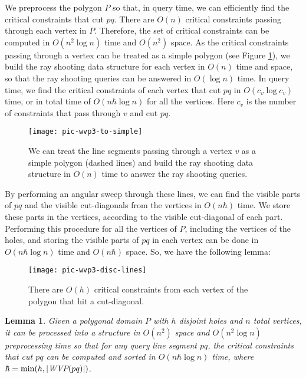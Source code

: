 \documentclass[5p]{elsarticle}
\newtheorem{lemma}[theorem]{Lemma}
\def\WVP{\mbox{\it{WVP}}}
\def\P{\mbox{${P}$}}
\begin{document}
We preprocess the polygon $\P$ so that, in query time, we can efficiently 
find the critical constraints that cut $pq$.
There are $O(n)$ critical constraints passing through each vertex in $\P$.
Therefore, the set of critical constraints can be computed in $O(n^2 \log n)$ time and 
$O(n^2)$ space. 
As the critical constraints passing through a vertex can be treated as a simple polygon 
(see Figure \ref{fig:wvp3-to-simple}),
we build the ray shooting data structure for each vertex in $O(n)$ time and space, so
that the ray shooting queries can be answered in $O(\log n)$ time.
In query time, we find the critical constraints of each vertex that cut $pq$ in $O(c_v \log c_v)$ time,
or in total time of $O(n\hbar \log n)$ for all the vertices. Here $c_v$ is the number of 
constraints that pass through $v$ and cut $pq$.

\begin{figure}[h]
  \centering
  \texttt{[image: pic-wvp3-to-simple]} 
  \caption{We can treat the line segments passing through a vertex $v$ as a simple
  polygon (dashed lines) and build the ray shooting data structure  in $O(n)$ time to answer the ray shooting 
  queries.}
  \label{fig:wvp3-to-simple}
\end{figure}



By performing an angular sweep through these lines, we can find the visible 
parts of $pq$ and the visible cut-diagonals from the vertices in $O(n\hbar)$ time.
We store these parts in the vertices, according to the visible cut-diagonal of each part.
Performing this procedure for all the vertices of $\P$, including the vertices of the holes,
and storing the visible parts of $pq$ in each vertex
can be done in $O(n\hbar \log n)$ time and $O(n\hbar)$ space. So, we have the following
lemma:


\begin{figure}[h]
  \centering
  \texttt{[image: pic-wvp3-disc-lines]} 
  \caption{There are $O(h)$ critical constraints from each vertex 
  of the polygon that hit a cut-diagonal.}
  \label{fig:wvp3-disc-lines}
\end{figure}


\begin{lemma}
Given a polygonal domain $\P$ with $h$ disjoint holes and $n$ total vertices, 
it can be processed into a structure in $O(n^2)$
space and $O(n^2 \log n)$ preprocessing time so that for any query
line segment $pq$, the critical constraints that cut $pq$
can be computed and sorted in $O(n\hbar \log n)$ time, where $\hbar = \min(h, |\WVP(pq)|)$.
\end{lemma}
\end{document}
